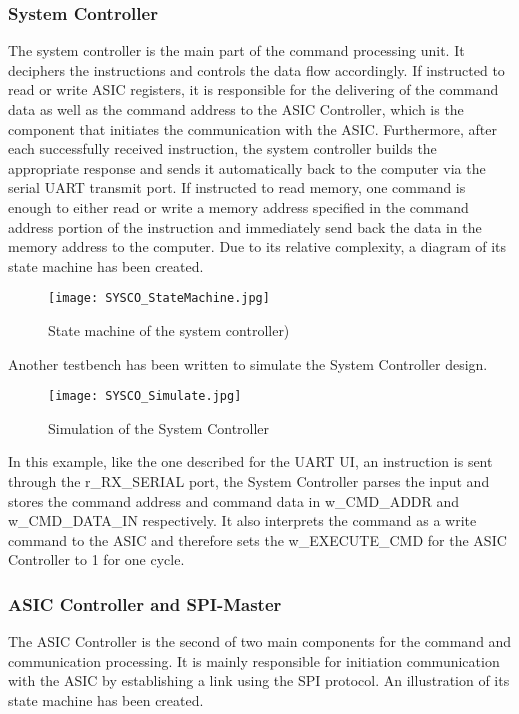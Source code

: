 \subsubsection{System Controller}
The system controller is the main part of the command processing unit. It deciphers the instructions and controls the data flow accordingly. If instructed to read or write ASIC registers, it is responsible for the delivering of the command data as well as the command address to the ASIC Controller, which is the component that initiates the communication with the ASIC. Furthermore, after each successfully received instruction, the system controller builds the appropriate response and sends it automatically back to the computer via the serial UART transmit port. If instructed to read memory, one command is enough to either read or write a memory address specified in the command address portion of the instruction and immediately send back the data in the memory address to the computer. Due to its relative complexity, a diagram of its state machine has been created.

\begin{figure}[H]
    \centering
    \texttt{[image: SYSCO\_StateMachine.jpg]}
    \caption[]{State machine of the system controller) }
    \label{fig:SYSCO}
\end{figure}
Another testbench has been written to simulate the System Controller design.

\begin{figure}[H]
    \centering
    \texttt{[image: SYSCO\_Simulate.jpg]}
    \caption[]{Simulation of the System Controller }
    \label{fig:SYSCO_Sim}
\end{figure}

In this example, like the one described for the UART UI, an instruction is sent through the r\_RX\_SERIAL port, the System Controller parses the input and stores the command address and command data in w\_CMD\_ADDR and w\_CMD\_DATA\_IN respectively. It also interprets the command as a write command to the ASIC and therefore sets the w\_EXECUTE\_CMD for the ASIC Controller to 1 for one cycle.

\subsubsection{ASIC Controller and SPI-Master}
The ASIC Controller is the second of two main components for the command and communication processing. It is mainly responsible for initiation communication with the ASIC by establishing a link using the SPI protocol. An illustration of its state machine has been created. 

